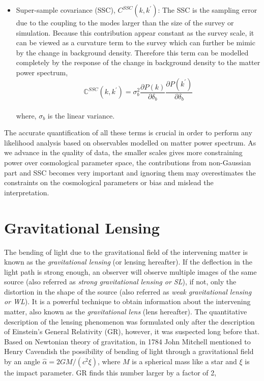 \begin{itemize}
	\item Super-sample covariance (SSC), $C^{SSC}(k,k^{\prime})$: The SSC is the sampling
			error due to the coupling to the modes larger than the size of the survey or
			simulation. Because this contribution appear constant as the survey scale, it 
			can be viewed as a curvature term to the survey which can further be mimic
			by the change in background density. Therefore this term can be modelled
			completely by the response of the change in background density to the
			matter power spectrum,
			\begin{equation}
				\mathbb{C}^{SSC}(k,k^{\prime}) = \sigma_b^2 \dfrac{\partial P(k)}{\partial \delta_b}
										\dfrac{\partial P(k^{\prime})}{\partial \delta_b}
			\end{equation}
			\\
			where, $\sigma_b$ is the linear variance. 
\end{itemize}

The accurate quantification of all these terms is crucial in order to perform any
likelihood analysis based on observables modelled on matter power spectrum. As we
advance in the quality of data, the smaller scales gives more constraining power 
over cosmological parameter space, the contributions from non-Gaussian part and SSC
becomes very important and ignoring them may overestimates the constraints on the 
cosmological parameters or bias and mislead the interpretation. 







\section{Gravitational Lensing}
The bending of light due to the gravitational field of the intervening matter is known as
the {\it gravitational lensing} (or lensing hereafter). If the deflection in the light
path is strong enough, an observer will observe multiple images of the same source 
(also referred as {\it strong gravitational lensing or SL}), 
if not, only the distortion in the shape of the source  
(also referred as {\it weak gravitational lensing or WL}). It is a powerful technique to 
obtain information about the intervening matter, also known as the {\it gravitational
lens} (lens hereafter). The quantitative description of the lensing phenomenon
was formulated only after the description of Einstein's General Relativity (GR), however,
it was suspected long before that. Based on Newtonian theory of gravitation, in 1784 
John Mitchell mentioned to Henry Cavendish the possibility of bending of light
through a gravitational field by an angle $\hat{\alpha} = 2GM/(c^2 \xi)$, where $M$ is a spherical
mass like a star and $\xi$ is the impact parameter. GR finds this number larger 
by a factor of 2,

